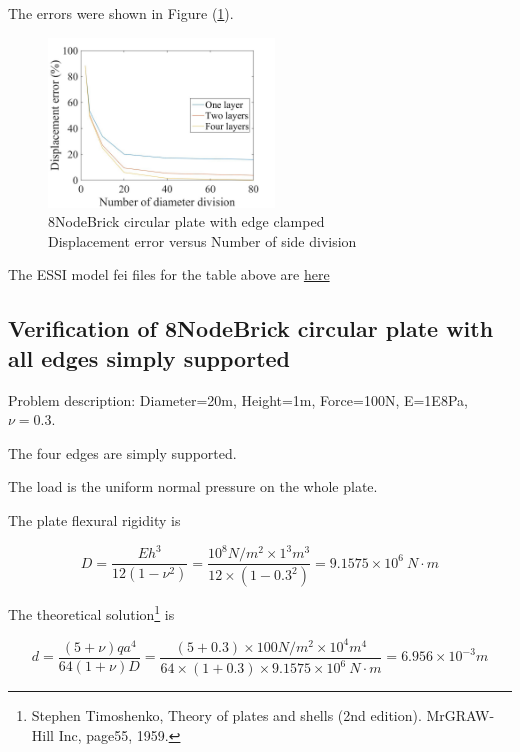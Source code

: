 \documentclass[fleqn,11pt]{article}
\begin{document}
The errors were shown in Figure (\ref{fig 8NodeBrick circular plate with edge clamped}).
\begin{figure}[H]
    \centering
    \includegraphics[width=6cm]{../Figure-files/error8brick_circular_plate_clamped.jpeg}
  \captionsetup{justification=centering,margin=3cm}
  \caption{8NodeBrick circular plate with edge clamped\\
      Displacement error   versus   Number of side division}
  \label{fig 8NodeBrick circular plate with edge clamped}
\end{figure}



The ESSI model fei files for the table above are \href{https://github.com/yuan-energy/ESSI_Verification/blob/master/8NodeBrick/circular_plate_clamped/circular_plate_clamped.tar.gz?raw=true}{here}






\newpage
\subsection{Verification of 8NodeBrick circular plate with all edges simply supported}


Problem description: Diameter=20m, Height=1m, Force=100N, E=1E8Pa, $\nu=0.3$. 

The four edges are simply supported. 

The load is the uniform normal pressure on the whole plate. 


The plate flexural rigidity is 

\begin{equation}
  D=\frac{Eh^3}{12(1-\nu^2)}=\frac{10^8 N/m^2 \times 1^3 m^3 }{12 \times (1-0.3^2) }= 9.1575 \times 10^6 \ N\cdot m
\end{equation}

The theoretical solution\footnote{Stephen Timoshenko, Theory of plates and shells (2nd edition). MrGRAW-Hill Inc, page55, 1959.} is 

\begin{equation}
  d= \frac{(5+\nu)  q a^4}{64(1+\nu) D}=\frac{(5+0.3)\times 100 N/m^2 \times 10^4 m^4}{64\times(1+0.3) \times 9.1575 \times 10^6 \ N\cdot m}=6.956\times 10^{-3} m
\end{equation}
\end{document}
